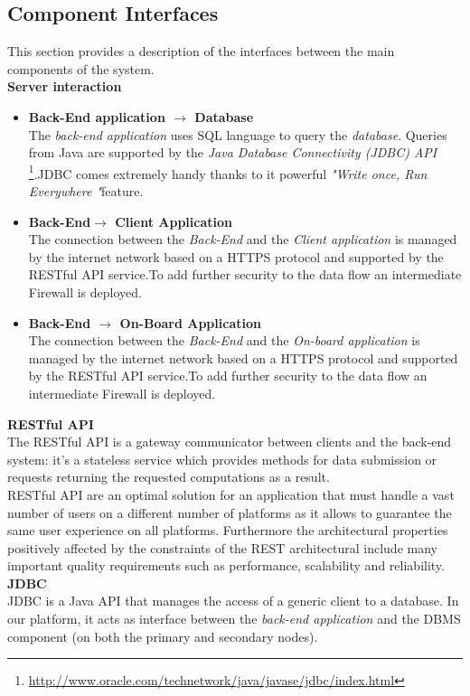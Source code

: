 \subsection{Component Interfaces}
\label{sec:CInter}
This section provides a description of the interfaces between the main components
of the system.
\\[0.2in]
\textbf{Server interaction}\\
\begin{itemize}
\item \textbf{Back-End application $\rightarrow$ Database}\\
The \emph{back-end application} uses SQL language to query the \emph{database}. Queries from Java 
are supported by the \emph{Java Database Connectivity (JDBC) API} \footnote{\url{http://www.oracle.com/technetwork/java/javase/jdbc/index.html}}.JDBC comes extremely handy thanks to it powerful \emph{"Write once, Run Everywhere "}feature.
\item \textbf{Back-End$\rightarrow$ Client Application}\\
The connection between the \emph{Back-End} and the \emph{Client application} is managed by the internet network based on a HTTPS protocol and supported by the RESTful API service.To add further security to the data flow an intermediate Firewall is deployed.
\item \textbf{Back-End $\rightarrow$ On-Board Application}\\
The connection between the \emph{Back-End} and the \emph{On-board application} is managed by the internet network based on a HTTPS protocol and supported by the RESTful API service.To add further security to the data flow an intermediate Firewall is deployed.
\end{itemize}
\textbf{RESTful API}\\The RESTful API is a gateway communicator between clients and the back-end system: it's a stateless service which provides methods for data submission or requests returning the requested computations as a result.\\
RESTful API are an optimal solution for an application that must handle a vast number of users on a different number of platforms as it allows to guarantee the same user experience on all platforms. Furthermore the architectural properties positively affected by the constraints of the REST architectural include many important quality requirements such as performance, scalability and reliability.\\[0.2in]
\newpage
\textbf{JDBC}\\
JDBC is a Java API that manages the access of a generic client to a database. In
our platform, it acts as interface between the \emph{back-end application} and the
DBMS component (on both the primary and secondary nodes).
